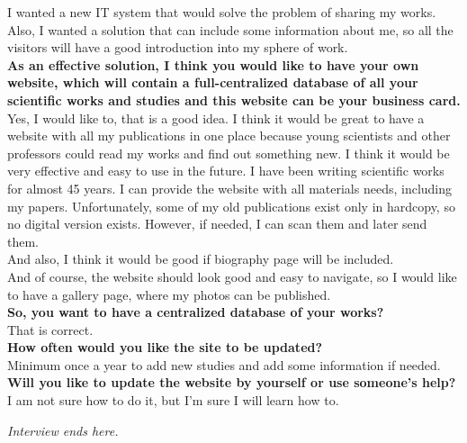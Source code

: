 \documentclass[a4paper]{article}
\begin{document}
I wanted a new IT system that would solve the problem of sharing my works. Also, I wanted a solution that can include some information about me, so all the visitors will have a good introduction into my sphere of work.\\

\textbf{As an effective solution, I think you would like to have your own website, which will contain a full-centralized database of all your scientific works and studies and this website can be your business card.}\\

Yes, I would like to, that is a good idea. I think it would be great to have a website with all my publications in one place because young scientists and other professors could read my works and find out something new. I think it would be very effective and easy to use in the future. I have been writing scientific works for almost 45 years. I can provide the website with all materials needs, including my papers. Unfortunately, some of my old publications exist only in hardcopy, so no digital version exists. However, if needed, I can scan them and later send them. \\

And also, I think it would be good if biography page will be included. \\

And of course, the website should look good and easy to navigate, so I would like to have a gallery page, where my photos can be published.\\

\textbf{So, you want to have a centralized database of your works?}\\

That is correct.\\

\textbf{How often would you like the site to be updated?}\\

Minimum once a year to add new studies and add some information if needed.\\

\textbf{Will you like to update the website by yourself or use someone’s help?}\\

I am not sure how to do it, but I’m sure I will learn how to.\\

\begin{center}
    \textit{Interview ends here.}
\end{center}
\end{document}
